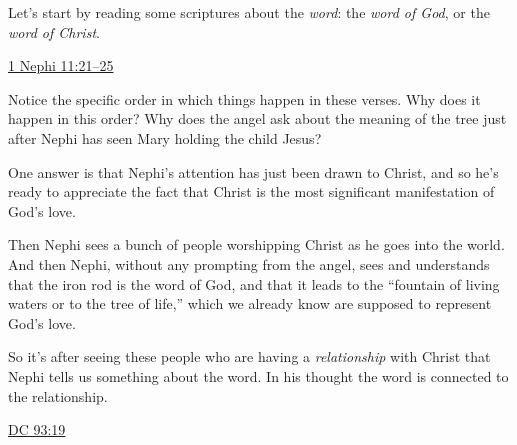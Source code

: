 \begin{compactitem}
				
			\item Let's start by reading some scriptures about the \textit{word}: the \textit{word of God}, or the \textit{word of Christ}.
				\begin{compactitem}
					\item \hyperref[1NEPHI-11-21]{1 Nephi 11:21--25}
						\begin{compactitem}
							\item Notice the specific order in which things happen in these verses. Why does it happen in this order? Why does the angel ask about the meaning of the tree just after Nephi has seen Mary holding the child Jesus?
							\item One answer is that Nephi's attention has just been drawn to Christ, and so he's ready to appreciate the fact that Christ is the most significant manifestation of God's love.
							\item Then Nephi sees a bunch of people worshipping Christ as he goes into the world. And then Nephi, without any prompting from the angel, sees and understands that the iron rod is the word of God, and that it leads to the ``fountain of living waters or to the tree of life,'' which we already know are supposed to represent God's love.
							\item So it's after seeing these people who are having a \textit{relationship} with Christ that Nephi tells us something about the word. In his thought the word is connected to the relationship.
						\end{compactitem}
					\item \hyperref[DC93-19]{DC 93:19}
						\begin{compactitem}

\end{compactitem}
\end{compactitem}
\end{compactitem}
